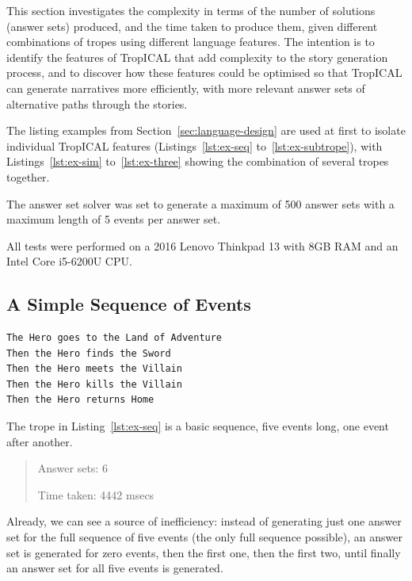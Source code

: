 \documentclass[11pt]{report}
\begin{document}
This section investigates the complexity in terms of the number of solutions
(answer sets) produced, and the time taken to produce them, given different
combinations of tropes using different language features. The intention is to
identify the features of TropICAL that add complexity to the story generation
process, and to discover how these features could be optimised so that TropICAL
can generate narratives more efficiently, with more relevant answer sets of
alternative paths through the stories.

The listing examples from Section~\ref{sec:language-design} are used at first to
isolate individual TropICAL features (Listings~\ref{lst:ex-seq}
to~\ref{lst:ex-subtrope}), with Listings~\ref{lst:ex-sim} to~\ref{lst:ex-three} showing the combination of several tropes together.

The answer set solver was set to generate a maximum of 500 answer sets with a
maximum length of 5 events per answer set.

All tests were performed on a 2016 Lenovo Thinkpad 13 with 8GB RAM and an Intel Core
i5-6200U CPU. 

\subsection{A Simple Sequence of Events}

\begin{lstlisting}[label={lst:ex-seq}, caption={A sequence of events}]
The Hero goes to the Land of Adventure
Then the Hero finds the Sword
Then the Hero meets the Villain
Then the Hero kills the Villain
Then the Hero returns Home
\end{lstlisting}

The trope in Listing~\ref{lst:ex-seq} is a basic sequence, five events long, one
event after another.

\begin{quote}
Answer sets: 6

Time taken: 4442 msecs
\end{quote}

Already, we can see a source of inefficiency: instead of generating just one
answer set for the full sequence of five events (the only full sequence
possible), an answer set is generated for zero events, then the first one, then
the first two, until finally an answer set for all five events is generated.

\end{document}
